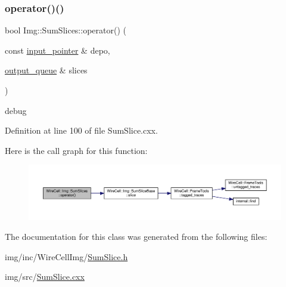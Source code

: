 \subsubsection{\texorpdfstring{operator()()}{operator()()}}
{\footnotesize\ttfamily bool Img\+::\+Sum\+Slices\+::operator() (\begin{DoxyParamCaption}\item[{const \hyperlink{class_wire_cell_1_1_i_queuedout_node_acf5f716a764553f3c7055a9cf67e906e}{input\+\_\+pointer} \&}]{depo,  }\item[{\hyperlink{class_wire_cell_1_1_i_queuedout_node_a39018e4e3dd886befac9636ac791a685}{output\+\_\+queue} \&}]{slices }\end{DoxyParamCaption})\hspace{0.3cm}{\ttfamily [virtual]}}

debug 

Definition at line 100 of file Sum\+Slice.\+cxx.

Here is the call graph for this function\+:
\nopagebreak
\begin{figure}[H]
\begin{center}
\leavevmode
\includegraphics[width=350pt]{class_wire_cell_1_1_img_1_1_sum_slices_a75a674a3d5db69eef80d0d7c465c5394_cgraph}
\end{center}
\end{figure}


The documentation for this class was generated from the following files\+:\begin{DoxyCompactItemize}
\item 
img/inc/\+Wire\+Cell\+Img/\hyperlink{_sum_slice_8h}{Sum\+Slice.\+h}\item 
img/src/\hyperlink{_sum_slice_8cxx}{Sum\+Slice.\+cxx}\end{DoxyCompactItemize}
